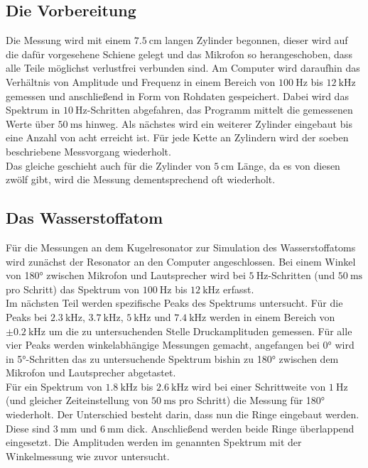 \subsection{Die Vorbereitung}
\label{sec:d2}
Die Messung wird mit einem $\qty{7.5}{\centi\meter}$ langen Zylinder begonnen, 
dieser wird auf die dafür vorgesehene Schiene gelegt und das Mikrofon so
herangeschoben, dass alle Teile möglichst verlustfrei verbunden sind. Am 
Computer wird daraufhin das Verhältnis von Amplitude und Frequenz in einem 
Bereich von $\qty{100}{\hertz}$ bis $\qty{12}{\kilo\hertz}$ gemessen und
anschließend in Form von Rohdaten gespeichert. Dabei wird das Spektrum in 
$\qty{10}{\hertz}$-Schritten abgefahren, das Programm mittelt die gemessenen 
Werte über $\qty{50}{\milli\second}$ hinweg. Als nächstes wird ein weiterer
Zylinder eingebaut bis eine Anzahl von acht erreicht ist. Für jede Kette an
Zylindern wird der soeben beschriebene Messvorgang wiederholt.
\\
Das gleiche geschieht auch für die Zylinder von $\qty{5}{\centi\meter}$ Länge, 
da es von diesen zwölf gibt, wird die Messung dementsprechend oft wiederholt.

\subsection{Das Wasserstoffatom}
\label{sec:d3}
Für die Messungen an dem Kugelresonator zur Simulation des Wasserstoffatoms 
wird zunächst der Resonator an den Computer angeschlossen. Bei einem Winkel 
von 180° zwischen Mikrofon und Lautsprecher wird bei $\qty{5}{\hertz}$-Schritten 
(und $\qty{50}{\milli\second}$ pro Schritt) das Spektrum von $\qty{100}{\hertz}$ 
bis $\qty{12}{\kilo\hertz}$ erfasst. \\
Im nächsten Teil werden spezifische Peaks des Spektrums untersucht. Für die 
Peaks bei $\qty{2.3}{\kilo\hertz}$, $\qty{3.7}{\kilo\hertz}$, $\qty{5}{\kilo\hertz}$
und $\qty{7.4}{\kilo\hertz}$ werden in einem Bereich von $\pm \qty{0.2}{\kilo\hertz}$
um die zu untersuchenden Stelle Druckamplituden gemessen. Für alle vier Peaks 
werden winkelabhängige Messungen gemacht, angefangen bei 0° wird in 5°-Schritten
das zu untersuchende Spektrum bishin zu 180° zwischen dem Mikrofon und Lautsprecher 
abgetastet. \\
Für ein Spektrum von $\qty{1.8}{\kilo\hertz}$ bis $\qty{2.6}{\kilo\hertz}$ wird 
bei einer Schrittweite von $\qty{1}{\hertz}$ (und gleicher Zeiteinstellung von 
$\qty{50}{\milli\second}$ pro Schritt) die Messung für 180° wiederholt. Der 
Unterschied besteht darin, dass nun die Ringe eingebaut werden. Diese sind 
$\qty{3}{\milli\meter}$ und $\qty{6}{\milli\meter}$ dick. Anschließend werden
beide Ringe überlappend eingesetzt. Die Amplituden werden im genannten Spektrum 
mit der Winkelmessung wie zuvor untersucht.